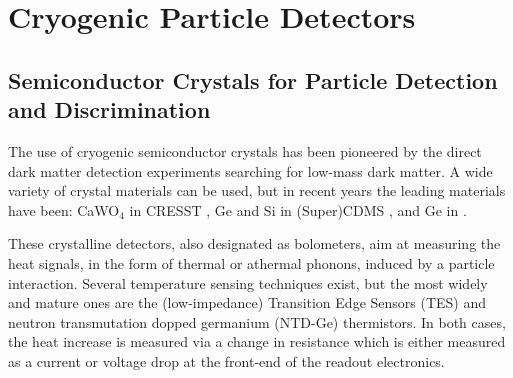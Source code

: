 


\section{Cryogenic Particle Detectors}

\subsection{Semiconductor Crystals for Particle Detection and Discrimination}

The use of cryogenic semiconductor crystals has been pioneered by the direct dark matter  detection experiments searching for low-mass dark matter. 
A wide variety of crystal materials can be used, but in recent years the leading materials have been: CaWO$_4$ in CRESST \cite{Abdelhameed:2019hmk}, Ge and Si in (Super)CDMS \cite{Agnese:2013ixa}, and Ge in \Edelweiss{} \cite{Armengaud:2017rzu}.

These crystalline detectors, also designated as bolometers, aim at measuring the heat signals, in the form of thermal or athermal phonons, induced by a particle interaction.
Several temperature sensing techniques exist, but the most widely and mature ones are the (low-impedance) Transition Edge Sensors (TES) and neutron transmutation dopped germanium (NTD-Ge) thermistors. In both cases, the heat increase is measured via a change in resistance which is either measured as a current or voltage drop at the front-end of the readout electronics.

